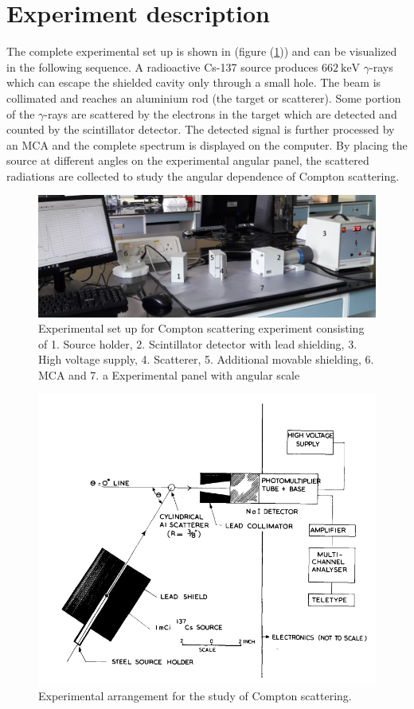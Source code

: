 \documentclass[%
 reprint,
nofootinbib,
 amsmath,amssymb,
 aps,
floatfix,
]{revtex4-2}
\begin{document}
\section{Experiment description}
    The complete experimental set up is shown in (figure (\ref{fig:setup})) and can be visualized in the following sequence. A radioactive Cs-137 source produces $\SI{662}{\kilo \electronvolt}$ $\gamma$-rays which can escape the shielded cavity only through a small hole. The beam is collimated and reaches an aluminium rod (the target or scatterer). Some portion of the $\gamma$-rays are scattered by the electrons in the target which are detected and counted by the scintillator detector. The detected signal is further processed by an MCA and the complete spectrum is displayed on the computer. By placing the source at different angles on the experimental angular panel, the scattered radiations are collected to study the angular dependence of Compton scattering.
    \begin{figure}
        \centering
        \includegraphics[scale = 0.39]{Figures/setup.png}
        \caption{Experimental set up for Compton scattering experiment consisting of 1. Source holder, 2. Scintillator detector with lead shielding, 3. High voltage supply, 4. Scatterer, 5. Additional movable shielding, 6. MCA and 7. a Experimental panel with angular scale}
        \label{fig:setup}
    \end{figure}
    \begin{figure}
        \centering
        \includegraphics[scale = 0.45]{Figures/schematic.png}
        \caption{Experimental arrangement for the study of Compton scattering.}
        \label{fig:schematic}
    \end{figure}
\end{document}
